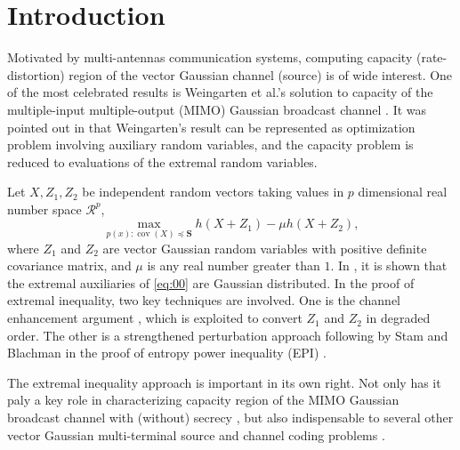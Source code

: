 \documentclass[journal,final, onecolumn]{IEEEtran}
\DeclareMathOperator{\cov}{cov}
\begin{document}
\newtheorem{theorem}{Theorem}
\newtheorem{lemma}{Lemma}
\newtheorem{definition}{Definition}
\newtheorem{remark}{Remark}
\newtheorem{example}{Example}
\newtheorem{corollary}{Corollary}
\newtheorem{proposition}{Propostion}

%








\section{Introduction}
Motivated by multi-antennas communication systems, computing capacity (rate-distortion) region of the vector Gaussian channel (source) is of wide interest. One of the most celebrated results is Weingarten et al.'s solution to capacity of the multiple-input multiple-output
(MIMO) Gaussian broadcast channel \cite{WSS06}. It was  pointed out in \cite{LV07} that Weingarten's result can be represented as optimization problem involving auxiliary random variables, and the capacity problem is reduced to evaluations of the extremal random variables.

Let ${X}, {Z}_{1}, {Z}_{2}$ be independent random vectors taking values in $p$ dimensional real number space $\mathcal{R}^{p}$,
\begin{equation}
\max_{p({x}): \cov ({X}) \preceq \boldsymbol{S}} h({X}+{Z}_{1})- \mu h({X}+{Z}_{2}), \label{eq:00}
\end{equation}
where ${Z}_{1}$ and ${Z}_{2}$ are vector Gaussian random variables with positive definite covariance matrix, and $\mu$ is any real number greater than $1$. In \cite{LV07}, it is shown that the extremal auxiliaries of \eqref{eq:00} are Gaussian distributed. In the proof of extremal inequality, two key techniques are involved. One is the channel enhancement argument \cite{WSS06}, which is exploited to convert ${Z}_{1}$ and ${Z}_{2}$ in degraded order. The other is a strengthened perturbation approach following by Stam \cite{S59} and Blachman \cite{B65} in the proof of entropy power inequality (EPI) \cite{S48}.

The extremal inequality approach is important in its own right. Not only has it paly a key role in characterizing capacity region of the MIMO Gaussian broadcast channel with (without) secrecy \cite{WLSSV09,LLL09,EU12-1,EU12-2,LLPS13,EU13-1,CL14-1,CL14-2,KL14}, but also indispensable to several other vector Gaussian multi-terminal source and channel coding problems \cite{WV07,XCW17,WC13,WC14,EU13,SCT15,XW13,XW16,SCKP10,SP12,SP13,UAZ20, WO11,XC21,XGLC20}.
\end{document}
